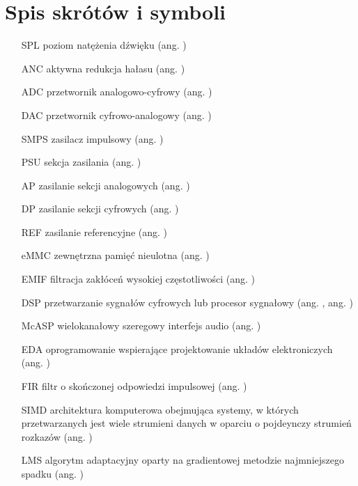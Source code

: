 \chapter{Spis skrótów i symboli}

\begin{itemize}
\item[SPL] poziom natężenia dźwięku (ang. )
\item[ANC] aktywna redukcja hałasu (ang. )
\item[ADC] przetwornik analogowo-cyfrowy (ang. ) 
\item[DAC] przetwornik cyfrowo-analogowy (ang. )
\item[SMPS] zasilacz impulsowy (ang. )
\item[PSU] sekcja zasilania (ang. )
\item[AP] zasilanie sekcji analogowych (ang. ) 
\item[DP] zasilanie sekcji cyfrowych (ang. )
\item[REF] zasilanie referencyjne (ang. )
\item[eMMC] zewnętrzna pamięć nieulotna (ang. )
\item[EMIF] filtracja zakłóceń wysokiej częstotliwości (ang.
    )
\item[DSP] przetwarzanie sygnałów cyfrowych lub procesor sygnałowy (ang.
    , ang. )
\item[McASP] wielokanałowy szeregowy interfejs audio (ang.
)
\item[EDA] oprogramowanie wspierające projektowanie układów elektroniczych (ang.
    )
\item[FIR] filtr o skończonej odpowiedzi impulsowej (ang. )
\item[SIMD] architektura komputerowa obejmująca systemy, w których
przetwarzanych jest wiele strumieni danych w oparciu o pojdeynczy strumień
rozkazów (ang. )
\item[LMS] algorytm adaptacyjny oparty na gradientowej metodzie najmniejszego
    spadku (ang. ) 

\end{itemize}
